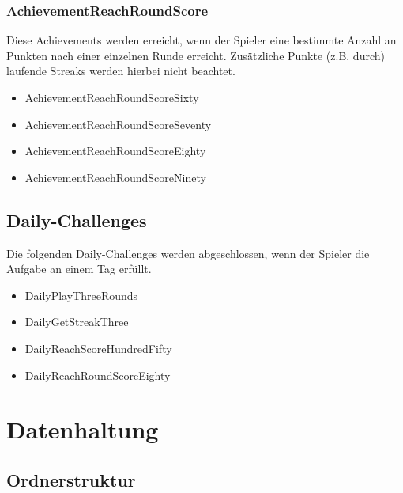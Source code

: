 \documentclass[a4paper]{scrreprt}
\begin{document}
	\subsection{AchievementReachRoundScore}
	Diese Achievements werden erreicht, wenn der Spieler eine bestimmte Anzahl an Punkten nach einer einzelnen Runde erreicht. Zusätzliche Punkte (z.B. durch) laufende Streaks werden hierbei nicht beachtet. \\
	\begin{itemize}
		\item AchievementReachRoundScoreSixty
		\item AchievementReachRoundScoreSeventy
		\item AchievementReachRoundScoreEighty
		\item AchievementReachRoundScoreNinety
	\end{itemize}


	\section{Daily-Challenges}
	\hypertarget{Daily}{}
	Die folgenden Daily-Challenges werden abgeschlossen, wenn der Spieler die Aufgabe an einem Tag erfüllt. \\
	\begin{itemize}
		\item DailyPlayThreeRounds
		\item DailyGetStreakThree
		\item DailyReachScoreHundredFifty
		\item DailyReachRoundScoreEighty
	\end{itemize}


	\chapter{Datenhaltung}

	\section{Ordnerstruktur}
\end{document}
